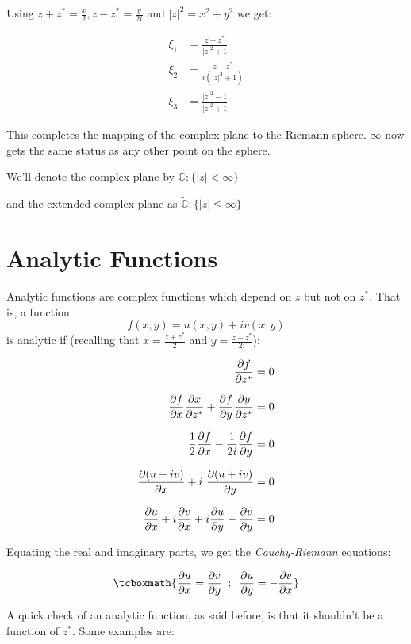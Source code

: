 \documentclass[12pt, letterpaper]{book}
\begin{document}
Using $z+z^*= \frac{x}{2}, z-z^*= \frac{y}{2i}$ and $|z|^2= x^2+y^2$ we get:

\begin{equation}
    \begin{aligned}
        \xi_1 &= \frac{z+z^*}{|z|^2+1}\\
        \xi_2 &= \frac{z-z^*}{i(|z|^2+1)}\\
        \xi_3 &= \frac{|z|^2-1}{|z|^2+1}
    \end{aligned}        
\end{equation}

This completes the mapping of the complex plane to the Riemann sphere. $\infty$ now gets the same status as any other point on the sphere. 

We'll denote the complex plane by $\mathbb{C}:\{|z|<\infty\}$

and the extended complex plane as $\tilde{\mathbb{C}}:\{|z|\leq\infty\} $

\section{Analytic Functions}

Analytic functions are complex functions which depend on $z$ but not on $z^*$. That is, a function $$f(x,y)= u(x,y)+iv(x,y)$$ is analytic if (recalling that $x= \frac{z+z^*}{2}$ and $y = \frac{z-z^*}{2i}$): 

\begin{equation*}
\setlength{\jot}{10pt}
    \begin{aligned}
        \pdv{f}{z^*} &= 0\\
        \pdv{f}{x}\pdv{x}{z^*}+\pdv{f}{y}\pdv{y}{z^*} &= 0\\
        \frac{1}{2}\pdv{f}{x}- \frac{1}{2i}\pdv{f}{y} &= 0\\
        \pdv{(u+iv)}{x}+ i\ \pdv{(u+iv)}{y} &= 0\\
        \pdv{u}{x} + i\pdv{v}{x}+ i\pdv{u}{y} - \pdv{v}{y} &= 0
    \end{aligned}        
\end{equation*}

Equating the real and imaginary parts, we get the \emph{Cauchy-Riemann} equations:

\begin{equation}
    \tcboxmath{\pdv{u}{x}= \pdv{v}{y}\;\; ; \;\; \pdv{u}{y} = -\pdv{v}{x}}
\end{equation}

A quick check of an analytic function, as said before, is that it shouldn't be a function of $z^*$. Some examples are: 
\end{document}

